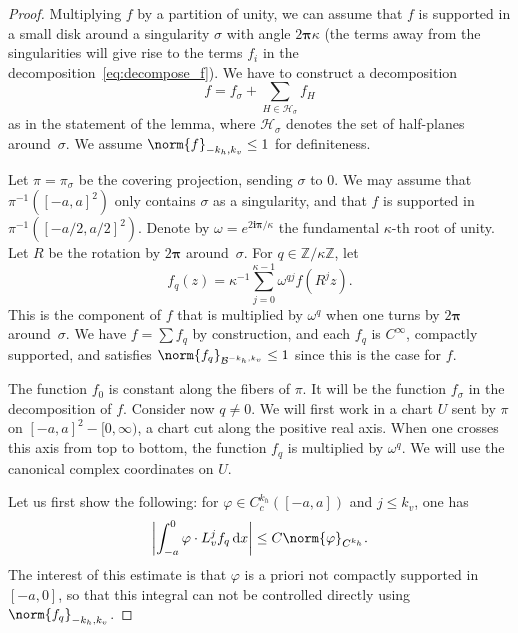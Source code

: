 \documentclass[JEP,XML,SOM,Unicode]{cedram}
\newcommand{\boH}{\mathcal{H}}
\newcommand{\boB}{\mathcal{B}}
\newcommand{\Z}{\mathbb{Z}}
\newcommand{\dd}{\mathop{}\!\mathrm{d}}
\newcommand{\ic}{\mathbf{i}}
\newcommand{\bpi}{\boldsymbol{\pi}}
\newcommand{\absgg}[1]{\biggl \lvert#1\biggr\rvert}
\let\phi\varphi
\theoremstyle{definition}
\numberwithin{equation}{section}
\begin{document}
\begin{proof}
Multiplying $f$ by a partition of unity, we can assume that $f$ is supported
in a small disk around a singularity $\sigma$ with angle $2\bpi\kappa$ (the
terms away from the singularities will give rise to the terms $f_i$ in the
decomposition~\eqref{eq:decompose_f}). We have to construct a decomposition
\begin{equation}
\label{eq:wpuxcvopiuwxopicv}
f = f_\sigma + \sum_{H\in \boH_\sigma} f_H
\end{equation}
as in the statement of the lemma, where $\boH_\sigma$ denotes the set of
half-planes around~$\sigma$. We assume $\norm{f}_{-k_h, k_v}\leq 1$ for
definiteness.

Let $\pi=\pi_\sigma$ be the covering projection, sending $\sigma$ to $0$. We
may assume that $\pi^{-1}([-a,a]^2)$ only contains $\sigma$ as a singularity,
and that $f$ is supported in $\pi^{-1}([-a/2, a/2]^2)$. Denote by $\omega =
e^{2\ic\bpi/\kappa}$ the fundamental $\kappa$-th root of unity. Let $R$ be
the rotation by $2\bpi$ around~$\sigma$. For $q \in \Z/\kappa \Z$, let
\[
f_q(z) = \kappa^{-1} \sum_{j=0}^{\kappa-1} \omega^{qj} f(R^j z).
\]
This is
the component of $f$ that is multiplied by $\omega^q$ when one turns by
$2\bpi$ around~$\sigma$. We have $f = \sum f_q$ by construction, and each
$f_q$ is $C^\infty$, compactly supported, and satisfies
$\norm{f_q}_{\boB^{-k_h, k_v}} \leq 1$ since this is the case for $f$.

The function $f_0$ is constant along the fibers of $\pi$. It will be the
function $f_\sigma$ in the decomposition of $f$. Consider now $q\neq 0$. We
will first work in a chart $U$ sent by $\pi$ on $[-a,a]^2 -[0, \infty)$,
\ie a chart cut along the positive real axis. When one crosses this axis
from top to bottom, the function $f_q$ is multiplied by $\omega^q$. We will
use the canonical complex coordinates on $U$.

Let us first show the following: for $\phi \in C_c^{k_h}([-a,a])$ and $j \leq
k_v$, one has
\begin{equation}
\label{eq:f_q_restr}
\absgg{\int_{-a}^0 \phi \cdot L_v^j f_q \dd x} \leq C \norm{\phi}_{C^{k_h}}.
\end{equation}
The interest of this estimate is that $\phi$ is a priori not compactly
supported in $[-a, 0]$, so that this integral can not be controlled directly
using $\norm{f_q}_{-k_h, k_v}$.


\end{proof}
\end{document}
